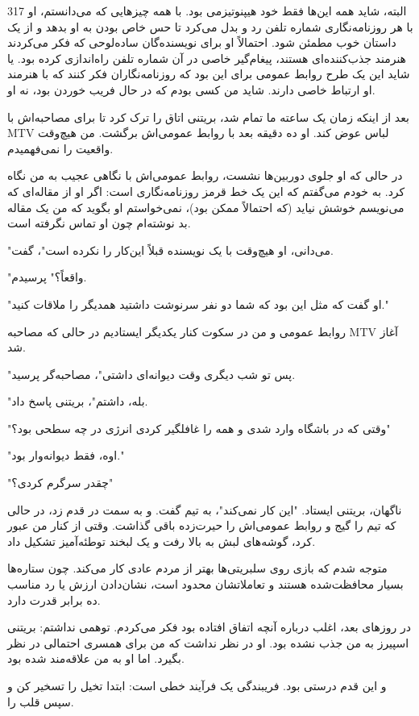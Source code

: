 317
البته، شاید همه این‌ها فقط خود هیپنوتیزمی بود. با همه چیزهایی که می‌دانستم، او با هر روزنامه‌نگاری شماره‌ تلفن رد و بدل می‌کرد تا حس خاص بودن به او بدهد و از یک داستان خوب مطمئن شود. احتمالاً او برای نویسنده‌گان ساده‌لوحی که فکر می‌کردند هنرمند جذب‌کننده‌ای هستند، پیغام‌گیر خاصی در آن شماره‌ تلفن راه‌اندازی کرده بود. یا شاید این یک طرح روابط عمومی برای این بود که روزنامه‌نگاران فکر کنند که با هنرمند او ارتباط خاصی دارند. شاید من کسی بودم که در حال فریب خوردن بود، نه او.

بعد از اینکه زمان یک ساعته ما تمام شد، بریتنی اتاق را ترک کرد تا برای مصاحبه‌اش با MTV لباس عوض کند. او ده دقیقه بعد با روابط عمومی‌اش برگشت. من هیچ‌وقت واقعیت را نمی‌فهمیدم.

در حالی که او جلوی دوربین‌ها نشست، روابط عمومی‌اش با نگاهی عجیب به من نگاه کرد. به خودم می‌گفتم که این یک خط قرمز روزنامه‌نگاری است: اگر او از مقاله‌ای که می‌نویسم خوشش نیاید (که احتمالاً ممکن بود)، نمی‌خواستم او بگوید که من یک مقاله بد نوشته‌ام چون او تماس نگرفته است.

"می‌دانی، او هیچ‌وقت با یک نویسنده قبلاً این‌کار را نکرده است"، گفت. 

"واقعاً؟" پرسیدم. 

"او گفت که مثل این بود که شما دو نفر سرنوشت داشتید همدیگر را ملاقات کنید."

روابط عمومی و من در سکوت کنار یکدیگر ایستادیم در حالی که مصاحبه MTV آغاز شد. 

"پس تو شب دیگری وقت دیوانه‌ای داشتی"، مصاحبه‌گر پرسید. 

"بله، داشتم"، بریتنی پاسخ داد. 

"وقتی که در باشگاه وارد شدی و همه را غافلگیر کردی انرژی در چه سطحی بود؟" 

"اوه، فقط دیوانه‌وار بود." 

"چقدر سرگرم کردی؟" 

ناگهان، بریتنی ایستاد. "این کار نمی‌کند"، به تیم گفت. و به سمت در قدم زد، در حالی که تیم را گیج و روابط عمومی‌اش را حیرت‌زده باقی گذاشت. وقتی از کنار من عبور کرد، گوشه‌های لبش به بالا رفت و یک لبخند توطئه‌آمیز تشکیل داد. 

متوجه شدم که بازی روی سلبریتی‌ها بهتر از مردم عادی کار می‌کند. چون ستاره‌ها بسیار محافظت‌شده هستند و تعاملاتشان محدود است، نشان‌دادن ارزش یا رد مناسب ده برابر قدرت دارد.

در روزهای بعد، اغلب درباره آنچه اتفاق افتاده بود فکر می‌کردم. توهمی نداشتم: بریتنی اسپیرز به من جذب نشده بود. او در نظر نداشت که من برای همسری احتمالی در نظر بگیرد. اما او به من علاقه‌مند شده بود. 

و این قدم درستی بود. فریبندگی یک فرآیند خطی است: ابتدا تخیل را تسخیر کن و سپس قلب را.


